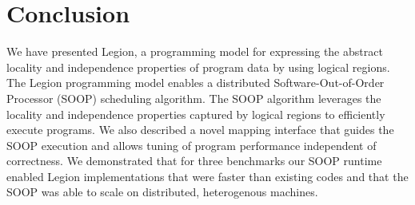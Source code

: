 \section{Conclusion}
\label{sec:conc}

We have presented Legion, a programming model for expressing
the abstract locality and independence properties of program
data by using logical regions.  The Legion programming model enables 
a distributed Software-Out-of-Order Processor (SOOP) scheduling 
algorithm.  The SOOP algorithm leverages the locality and independence properties
captured by logical regions to efficiently execute programs.  We also
described a novel mapping interface that guides the SOOP execution
and allows tuning of program performance independent of correctness.
We demonstrated that for three benchmarks our SOOP runtime 
enabled Legion implementations that were faster than existing codes
and that the SOOP was able to scale on distributed, heterogenous machines.


